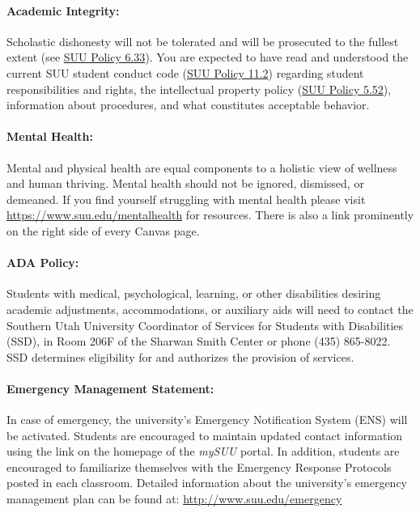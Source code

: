 \documentclass[12pt, letterpaper]{article}
\begin{document}
\paragraph{Academic Integrity:}
Scholastic dishonesty will not be tolerated and will be prosecuted to the fullest extent (see \href{https://www.suu.edu/policies/06/33.html}{SUU Policy 6.33}). You are expected to have read and understood the current SUU student conduct code (\href{https://www.suu.edu/policies/11/02.html}{SUU Policy 11.2}) regarding student responsibilities and rights, the intellectual property policy (\href{https://www.suu.edu/policies/05/52.html}{SUU Policy 5.52}), information about procedures, and what constitutes acceptable behavior.

\paragraph{Mental Health:}
Mental and physical health are equal components to a holistic view of wellness and human thriving. Mental health should not be ignored, dismissed, or demeaned. If you find yourself struggling with mental health please visit \href{https://www.suu.edu/mentalhealth}{https://www.suu.edu/mentalhealth} for resources. There is also a link prominently on the right side of every Canvas page.

\paragraph{ADA Policy:}
Students with medical, psychological, learning, or other disabilities desiring academic adjustments, accommodations, or auxiliary aids will need to contact the Southern Utah University Coordinator of Services for Students with Disabilities (SSD), in Room 206F of the Sharwan Smith Center or phone (435) 865-8022. SSD determines eligibility for and authorizes the provision of services.

\paragraph{Emergency Management Statement:}
In case of emergency, the university's Emergency Notification System (ENS) will be activated. Students are encouraged to maintain updated contact information using the link on the homepage of the \emph{mySUU} portal. In addition, students are encouraged to familiarize themselves with the Emergency Response Protocols posted in each classroom. Detailed information about the university's emergency management plan can be found at: \href{http://www.suu.edu/emergency}{http://www.suu.edu/emergency}
\end{document}
